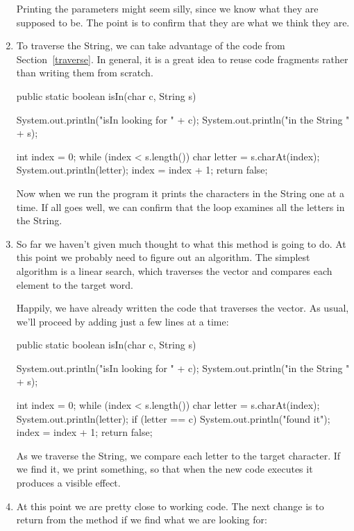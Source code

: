\documentclass{book}
\begin{document}
\begin{enumerate}
Printing the parameters might seem silly, since we know what they
are supposed to be.  The point is to confirm that they are what we
think they are.


\item To traverse the String, we can take advantage of the code
from Section~\ref{traverse}.  In general, it is a great idea to
reuse code fragments rather than writing them from scratch.

\begin{verbatimtab}
public static boolean isIn(char c, String s) {
    System.out.println("isIn looking for " + c);
    System.out.println("in the String " + s);

    int index = 0;
    while (index < s.length()) {
        char letter = s.charAt(index);
        System.out.println(letter);
        index = index + 1;
    }
    return false;
}
\end{verbatimtab}

Now when we run the program it prints the characters in
the String one at a time.  
If all goes well, we can confirm that
the loop examines all the letters in the String.


\item So far we haven't given much thought to what this method
is going to do.  At this point we probably need to figure out an
algorithm.  The simplest algorithm is a linear search, which
traverses the vector and compares each element to the target word.

Happily, we have already written the code that traverses the
vector.  As usual, we'll proceed by adding just a few lines
at a time:

\begin{verbatimtab}
public static boolean isIn(char c, String s) {
    System.out.println("isIn looking for " + c);
    System.out.println("in the String " + s);

    int index = 0;
    while (index < s.length()) {
        char letter = s.charAt(index);
        System.out.println(letter);
        if (letter == c) {
            System.out.println("found it");
        }
        index = index + 1;
    }
    return false;
}
\end{verbatimtab}

As we traverse the String, we compare each letter to the target
character.  If we find it, we print something, so
that when the new code executes it produces a visible effect.

\item At this point we are pretty close to working code.  The
next change is to return from the method if we find what we are
looking for:


\end{enumerate}
\end{document}
